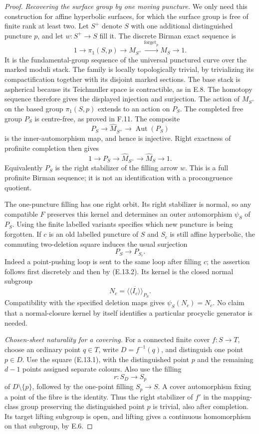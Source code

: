 \begin{proof}
\emph{Recovering the surface group by one moving puncture.}
We only need this construction for affine hyperbolic surfaces, for which
the surface group is free of finite rank at least two. Let $S^+$ denote
$S$ with one additional distinguished puncture $p$, and let
$w:S^+\to S$ fill it. The discrete Birman exact sequence is
\[
 1\longrightarrow\pi_1(S,p)\longrightarrow M_{S^+}
 \xrightarrow{\operatorname{forget}_p}M_S\longrightarrow1.
\]
It is the fundamental-group sequence of the universal punctured curve
over the marked moduli stack. The family is locally topologically
trivial, by trivializing its compactification together with its disjoint
marked sections. The base stack is aspherical because its Teichmuller
space is contractible, as in E.8. The homotopy sequence therefore gives
the displayed injection and surjection.
The action of $M_{S^+}$ on the based group $\pi_1(S,p)$ extends to
an action on $P_S$. The completed free group $P_S$ is centre-free,
as proved in F.11. The composite
\[
 P_S\longrightarrow\widehat M_{S^+}
 \longrightarrow\operatorname{Aut}(P_S)
\]
is the inner-automorphism map, and hence is injective. Right exactness
of profinite completion then gives
\[
 1\longrightarrow P_S\longrightarrow\widehat M_{S^+}
 \longrightarrow\widehat M_S\longrightarrow1.                \tag{E.13.2}
\]
Equivalently $P_S$ is the right stabilizer of the filling arrow $w$.
This is a full profinite Birman sequence; it is not an identification
with a procongruence quotient.

The one-puncture filling has one right orbit. Its right stabilizer is
normal, so any compatible $F$ preserves this kernel and determines an
outer automorphism $\psi_S$ of $P_S$. Using the finite labelled
variants specifies which new puncture is being forgotten. If $c$ is an
old labelled puncture of $S$ and $S_c$ is still affine hyperbolic, the
commuting two-deletion square induces the usual surjection
\[
 P_S\longrightarrow P_{S_c}.
\]
Indeed a point-pushing loop is sent to the same loop after filling $c$;
the assertion follows first discretely and then by (E.13.2). Its kernel
is the closed normal subgroup
\[
 N_c=\overline{\langle\!\langle I_c\rangle\!\rangle}_{P_S}.
\]
Compatibility with the specified deletion maps gives
$\psi_S(N_c)=N_c$. No claim that a normal-closure kernel by itself
identifies a particular procyclic generator is needed.

\emph{Chosen-sheet naturality for a covering.}
For a connected finite cover $f:S\to T$, choose an ordinary point
$q\in T$, write $D=f^{-1}(q)$, and distinguish one point $p\in D$.
Use the square (E.13.1), with the distinguished point $p$ and the
remaining $d-1$ points assigned separate colours. Also use the filling
\[
 r:S_D\longrightarrow S_p
\]
of $D\setminus\{p\}$, followed by the one-point filling
$S_p\to S$. A cover automorphism fixing a point of the fibre is the
identity. Thus the right stabilizer of $f'$ in the mapping-class group
preserving the distinguished point $p$ is trivial, also after completion.
Its target lifting subgroup is open, and lifting gives a continuous
homomorphism on that subgroup, by E.6.


\end{proof}
